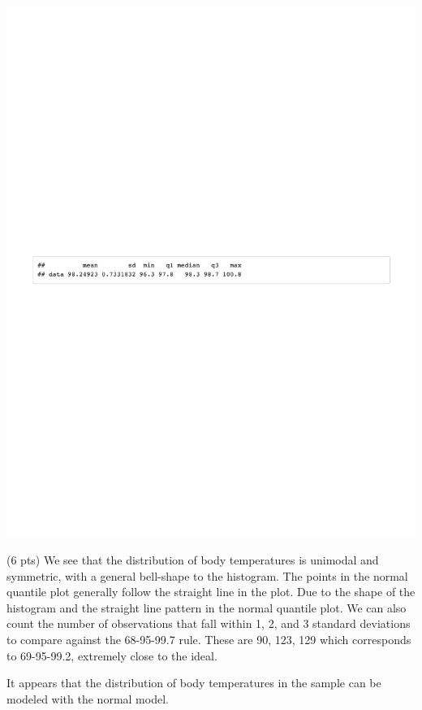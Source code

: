 \documentclass{article}
\begin{document}
\begin{enumerate}
\includegraphics[width=6in]{hmwkch5-summary.pdf}

(6 pts)  We see that the distribution of body temperatures is unimodal and symmetric, with a general bell-shape to the histogram.  The points in the normal quantile plot generally follow the straight line in the plot. Due to the shape of the histogram and the straight line pattern in the normal quantile plot.  We can also count the number of observations that fall within 1, 2, and 3 standard deviations to compare against the 68-95-99.7 rule. These are 90, 
123, 129 which corresponds to 69-95-99.2, extremely close to the ideal. 

It appears that the distribution of body temperatures in the sample can be modeled with the normal model.


\end{enumerate}
\end{document}
